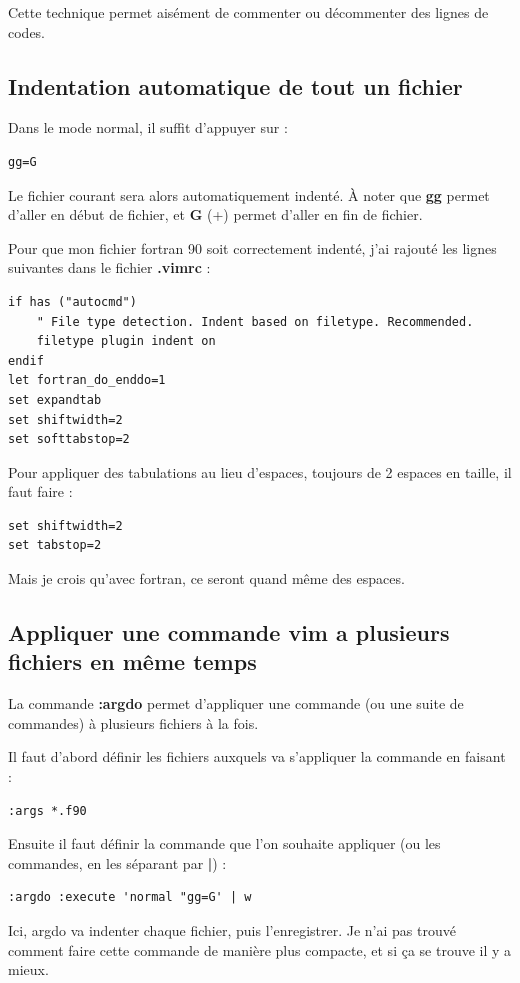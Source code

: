 \documentclass[a4paper,twoside]{article}
\begin{document}
\begin{remarque}
Cette technique permet aisément de commenter ou décommenter des lignes de codes.
\end{remarque}

\subsection{Indentation automatique de tout un fichier}
Dans le mode normal, il suffit d'appuyer sur :
\begin{verbatim}
gg=G
\end{verbatim}
Le fichier courant sera alors automatiquement indenté. À noter que \textbf{gg} permet d'aller en début de fichier, et \textbf{G} (+) permet d'aller en fin de fichier.

Pour que mon fichier fortran 90 soit correctement indenté, j'ai rajouté les lignes suivantes dans le fichier \textbf{.vimrc} : 
\begin{verbatim}
if has ("autocmd")
    " File type detection. Indent based on filetype. Recommended.
    filetype plugin indent on
endif
let fortran_do_enddo=1
set expandtab
set shiftwidth=2
set softtabstop=2
\end{verbatim}

Pour appliquer des tabulations au lieu d'espaces, toujours de 2 espaces en taille, il faut faire :
\begin{verbatim}
set shiftwidth=2
set tabstop=2
\end{verbatim}

\begin{remarque}
Mais je crois qu'avec fortran, ce seront quand même des espaces.
\end{remarque}

\subsection{Appliquer une commande vim a plusieurs fichiers en même temps}
La commande \textbf{:argdo} permet d'appliquer une commande (ou une suite de commandes) à plusieurs fichiers à la fois. 

Il faut d'abord définir les fichiers auxquels va s'appliquer la commande en faisant :
\begin{verbatim}
:args *.f90
\end{verbatim}

Ensuite il faut définir la commande que l'on souhaite appliquer (ou les commandes, en les séparant par \textbf{|}) : 
\begin{verbatim}
:argdo :execute 'normal "gg=G' | w
\end{verbatim}
Ici, argdo va indenter chaque fichier, puis l'enregistrer. Je n'ai pas trouvé comment faire cette commande de manière plus compacte, et si ça se trouve il y a mieux.
\end{document}
